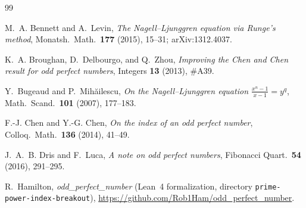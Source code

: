 \documentclass[11pt]{amsart}
\theoremstyle{definition}
\theoremstyle{remark}
\begin{document}
\begin{thebibliography}{99}

M.~A. Bennett and A.~Levin, \emph{The Nagell--Ljunggren equation via Runge's method}, Monatsh.\ Math.\ \textbf{177} (2015), 15--31; arXiv:1312.4037.

K.~A. Broughan, D.~Delbourgo, and Q.~Zhou, \emph{Improving the Chen and Chen result for odd perfect numbers}, Integers \textbf{13} (2013), \#A39.

Y.~Bugeaud and P.~Mih\u{a}ilescu, \emph{On the Nagell--Ljunggren equation $\frac{x^n - 1}{x - 1} = y^q$}, Math.\ Scand.\ \textbf{101} (2007), 177--183.

F.-J. Chen and Y.-G. Chen, \emph{On the index of an odd perfect number}, Colloq.\ Math.\ \textbf{136} (2014), 41--49.

J.~A.~B. Dris and F.~Luca, \emph{A note on odd perfect numbers}, Fibonacci Quart.\ \textbf{54} (2016), 291--295.

R.~Hamilton, \emph{odd\_perfect\_number} (Lean~4 formalization, directory \texttt{prime-power-index-breakout}), \url{https://github.com/Rob1Ham/odd_perfect_number}.

\end{thebibliography}
\end{document}
